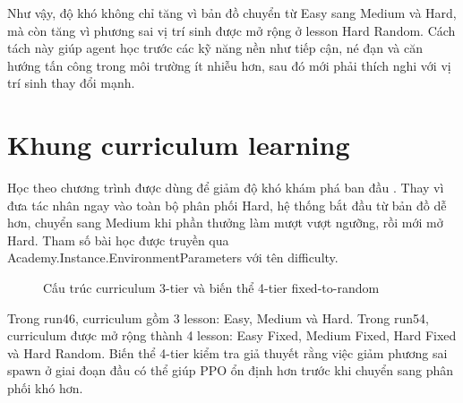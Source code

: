 Như vậy, độ khó không chỉ tăng vì bản đồ chuyển từ Easy sang Medium và Hard, mà còn tăng vì phương sai vị trí sinh được mở rộng ở lesson Hard Random. Cách tách này giúp agent học trước các kỹ năng nền như tiếp cận, né đạn và căn hướng tấn công trong môi trường ít nhiễu hơn, sau đó mới phải thích nghi với vị trí sinh thay đổi mạnh.

\section{Khung curriculum learning}

Học theo chương trình được dùng để giảm độ khó khám phá ban đầu \cite{Bengio2009}. Thay vì đưa tác nhân ngay vào toàn bộ phân phối Hard, hệ thống bắt đầu từ bản đồ dễ hơn, chuyển sang Medium khi phần thưởng làm mượt vượt ngưỡng, rồi mới mở Hard. Tham số bài học được truyền qua Academy.Instance.EnvironmentParameters với tên difficulty.

\begin{figure}[H]
    \centering
    \caption{Cấu trúc curriculum 3-tier và biến thể 4-tier fixed-to-random}
    \label{fig:curriculum_structure}
\end{figure}

Trong run46, curriculum gồm 3 lesson: Easy, Medium và Hard. Trong run54, curriculum được mở rộng thành 4 lesson: Easy Fixed, Medium Fixed, Hard Fixed và Hard Random. Biến thể 4-tier kiểm tra giả thuyết rằng việc giảm phương sai spawn ở giai đoạn đầu có thể giúp PPO ổn định hơn trước khi chuyển sang phân phối khó hơn.

